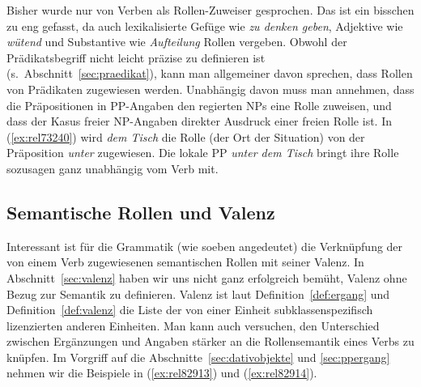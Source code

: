 Bisher wurde nur von Verben als Rollen-Zuweiser gesprochen.
Das ist ein bisschen zu eng gefasst, da auch lexikalisierte Gefüge wie \textit{zu denken geben}, Adjektive wie \textit{wütend} und Substantive wie \textit{Aufteilung} Rollen vergeben.
Obwohl der Prädikatsbegriff nicht leicht präzise zu definieren ist (s.\ Abschnitt~\ref{sec:praedikat}), kann man allgemeiner davon sprechen, dass Rollen von Prädikaten zugewiesen werden.
Unabhängig davon muss man annehmen, dass die Präpositionen in PP-Angaben den regierten NPs eine Rolle zuweisen, und dass der Kasus freier NP-Angaben direkter Ausdruck einer freien Rolle ist.
In (\ref{ex:rel73240}) wird \textit{dem Tisch} die Rolle (der Ort der Situation) von der Präposition \textit{unter} zugewiesen.
Die lokale PP \textit{unter dem Tisch} bringt ihre Rolle sozusagen ganz unabhängig vom Verb mit.

\begin{exe}
\end{exe}

\subsection{Semantische Rollen und Valenz}


Interessant ist für die Grammatik (wie soeben angedeutet) die Verknüpfung der von einem Verb zugewiesenen semantischen Rollen mit seiner Valenz.
In Abschnitt~\ref{sec:valenz} haben wir uns nicht ganz erfolgreich bemüht, Valenz ohne Bezug zur Semantik zu definieren.
Valenz ist laut Definition~\ref{def:ergang} und Definition~\ref{def:valenz} die Liste der von einer Einheit subklassenspezifisch lizenzierten anderen Einheiten.
Man kann auch versuchen, den Unterschied zwischen Ergänzungen und Angaben stärker an die Rollensemantik eines Verbs zu knüpfen.
Im Vorgriff auf die Abschnitte~\ref{sec:dativobjekte} und \ref{sec:ppergang} nehmen wir die Beispiele in (\ref{ex:rel82913}) und (\ref{ex:rel82914}).

\begin{exe}
  \ex\label{ex:rel82913} 
  \begin{xlist}
  \end{xlist}
  \ex\label{ex:rel82914} 
  \begin{xlist}
  \end{xlist}
\end{exe}

